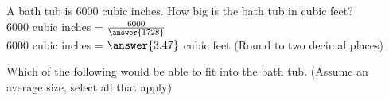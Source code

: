 \documentclass{ximera}
\author{Carolyn Johns}
\begin{document}
  \begin{exercise}
A bath tub is 6000 cubic inches. How big is the bath tub in cubic feet?\\ 
$6000$ cubic inches = $\frac{6000}{\answer{1728}}$\\
$6000$ cubic inches = $\answer{3.47}$ cubic feet \calcHW (Round to two decimal places)


\begin{exercise}
Which of the following would be able to fit into the bath tub. (Assume an average size, select all that apply)

\begin{selectAll}


\end{selectAll}
\end{exercise}

 \end{exercise}
\end{document}
